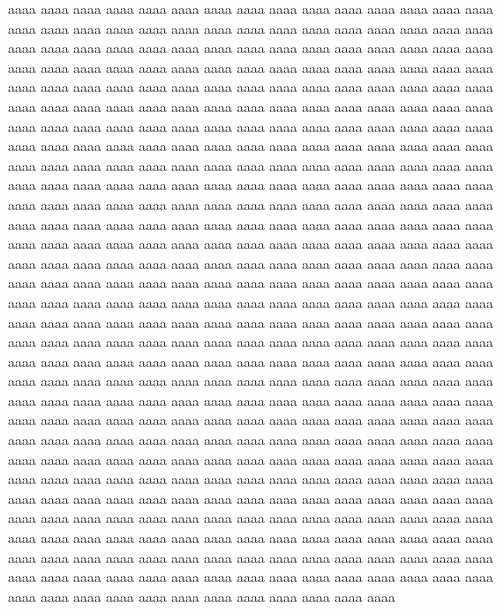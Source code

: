 \documentclass[10pt,dvipdfmx,landscape]{jsarticle}
\begin{document}
aaaa aaaa aaaa aaaa aaaa aaaa aaaa aaaa aaaa aaaa aaaa 
aaaa aaaa aaaa aaaa aaaa aaaa aaaa aaaa aaaa aaaa aaaa 
aaaa aaaa aaaa aaaa aaaa aaaa aaaa aaaa aaaa aaaa aaaa 
aaaa aaaa aaaa aaaa aaaa aaaa aaaa aaaa aaaa aaaa aaaa 
aaaa aaaa aaaa aaaa aaaa aaaa aaaa aaaa aaaa aaaa aaaa 
aaaa aaaa aaaa aaaa aaaa aaaa aaaa aaaa aaaa aaaa aaaa 
aaaa aaaa aaaa aaaa aaaa aaaa aaaa aaaa aaaa aaaa aaaa 
aaaa aaaa aaaa aaaa aaaa aaaa aaaa aaaa aaaa aaaa aaaa 
aaaa aaaa aaaa aaaa aaaa aaaa aaaa aaaa aaaa aaaa aaaa 
aaaa aaaa aaaa aaaa aaaa aaaa aaaa aaaa aaaa aaaa aaaa 
aaaa aaaa aaaa aaaa aaaa aaaa aaaa aaaa aaaa aaaa aaaa 
aaaa aaaa aaaa aaaa aaaa aaaa aaaa aaaa aaaa aaaa aaaa 
aaaa aaaa aaaa aaaa aaaa aaaa aaaa aaaa aaaa aaaa aaaa 
aaaa aaaa aaaa aaaa aaaa aaaa aaaa aaaa aaaa aaaa aaaa 
aaaa aaaa aaaa aaaa aaaa aaaa aaaa aaaa aaaa aaaa aaaa 
aaaa aaaa aaaa aaaa aaaa aaaa aaaa aaaa aaaa aaaa aaaa 
aaaa aaaa aaaa aaaa aaaa aaaa aaaa aaaa aaaa aaaa aaaa 
aaaa aaaa aaaa aaaa aaaa aaaa aaaa aaaa aaaa aaaa aaaa 
aaaa aaaa aaaa aaaa aaaa aaaa aaaa aaaa aaaa aaaa aaaa 
aaaa aaaa aaaa aaaa aaaa aaaa aaaa aaaa aaaa aaaa aaaa 
aaaa aaaa aaaa aaaa aaaa aaaa aaaa aaaa aaaa aaaa aaaa 
aaaa aaaa aaaa aaaa aaaa aaaa aaaa aaaa aaaa aaaa aaaa 
aaaa aaaa aaaa aaaa aaaa aaaa aaaa aaaa aaaa aaaa aaaa 
aaaa aaaa aaaa aaaa aaaa aaaa aaaa aaaa aaaa aaaa aaaa 
aaaa aaaa aaaa aaaa aaaa aaaa aaaa aaaa aaaa aaaa aaaa 
aaaa aaaa aaaa aaaa aaaa aaaa aaaa aaaa aaaa aaaa aaaa 
aaaa aaaa aaaa aaaa aaaa aaaa aaaa aaaa aaaa aaaa aaaa 
aaaa aaaa aaaa aaaa aaaa aaaa aaaa aaaa aaaa aaaa aaaa 
aaaa aaaa aaaa aaaa aaaa aaaa aaaa aaaa aaaa aaaa aaaa 
aaaa aaaa aaaa aaaa aaaa aaaa aaaa aaaa aaaa aaaa aaaa 
aaaa aaaa aaaa aaaa aaaa aaaa aaaa aaaa aaaa aaaa aaaa 
aaaa aaaa aaaa aaaa aaaa aaaa aaaa aaaa aaaa aaaa aaaa 
aaaa aaaa aaaa aaaa aaaa aaaa aaaa aaaa aaaa aaaa aaaa 
aaaa aaaa aaaa aaaa aaaa aaaa aaaa aaaa aaaa aaaa aaaa 
aaaa aaaa aaaa aaaa aaaa aaaa aaaa aaaa aaaa aaaa aaaa 
aaaa aaaa aaaa aaaa aaaa aaaa aaaa aaaa aaaa aaaa aaaa 
aaaa aaaa aaaa aaaa aaaa aaaa aaaa aaaa aaaa aaaa aaaa 
aaaa aaaa aaaa aaaa aaaa aaaa aaaa aaaa aaaa aaaa aaaa 
aaaa aaaa aaaa aaaa aaaa aaaa aaaa aaaa aaaa aaaa aaaa 
aaaa aaaa aaaa aaaa aaaa aaaa aaaa aaaa aaaa aaaa aaaa 
aaaa aaaa aaaa aaaa aaaa aaaa aaaa aaaa aaaa aaaa aaaa 
aaaa aaaa aaaa aaaa aaaa aaaa aaaa aaaa aaaa aaaa aaaa 
\end{document}
